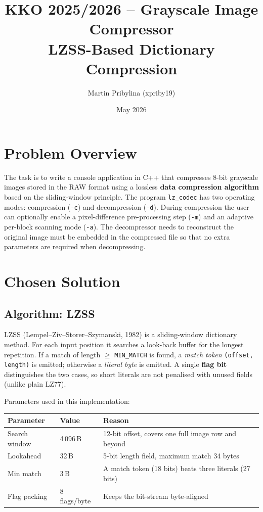 \documentclass[a4paper,11pt]{article}
\title{\textbf{KKO 2025/2026 -- Grayscale Image Compressor}\\[0.3em]
       \large LZSS-Based Dictionary Compression}
\author{Martin Pribylina (xpriby19)}
\date{May 2026}
\begin{document}
\maketitle
\thispagestyle{empty}

\section{Problem Overview}

The task is to write a console application in C++ that compresses 8-bit
grayscale images stored in the RAW format using a lossless
\textbf{data compression algorithm} based on the sliding-window principle.
The program \texttt{lz\_codec} has two operating modes: compression
(\texttt{-c}) and decompression (\texttt{-d}).  During compression the user
can optionally enable a pixel-difference pre-processing step (\texttt{-m})
and an adaptive per-block scanning mode (\texttt{-a}).  The
decompressor needs to reconstruct the original image must be embedded in the
compressed file so that no extra parameters are required when decompressing.

\section{Chosen Solution}

\subsection*{Algorithm: LZSS}

LZSS (Lempel--Ziv--Storer--Szymanski, 1982) is a sliding-window dictionary
method.  For each input position it searches a look-back buffer for the
longest repetition.  If a match of length $\geq$ \texttt{MIN\_MATCH} is
found, a \emph{match token} \texttt{(offset, length)} is emitted; otherwise
a \emph{literal byte} is emitted.  A single \textbf{flag bit} distinguishes
the two cases, so short literals are not penalised with unused fields (unlike
plain LZ77).

Parameters used in this implementation:

\begin{center}
\begin{tabular}{lll}
\toprule
Parameter & Value & Reason \\
\midrule
Search window & 4\,096\,B & 12-bit offset, covers one full image row and beyond \\
Lookahead & 32\,B & 5-bit length field, maximum match 34 bytes \\
Min match & 3\,B & A match token (18 bits) beats three literals (27 bits) \\
Flag packing & 8 flags/byte & Keeps the bit-stream byte-aligned \\
\bottomrule
\end{tabular}
\end{center}
\end{document}

